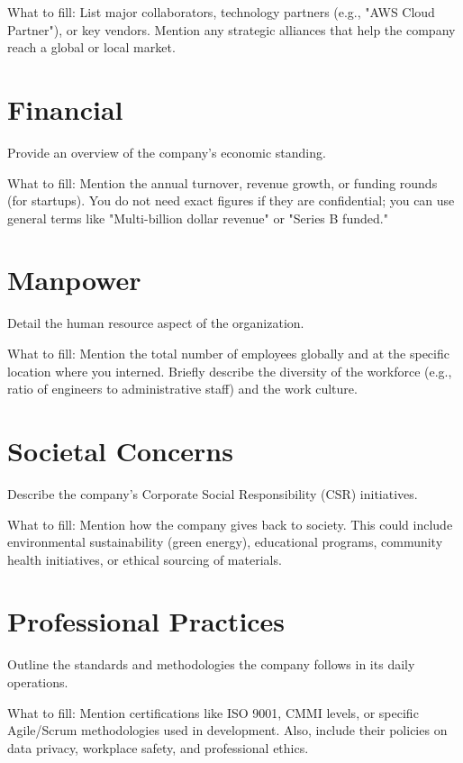 What to fill: List major collaborators, technology partners (e.g., "AWS Cloud Partner"), or key vendors. Mention any strategic alliances that help the company reach a global or local market.

\section{Financial}
Provide an overview of the company's economic standing.

What to fill: Mention the annual turnover, revenue growth, or funding rounds (for startups). You do not need exact figures if they are confidential; you can use general terms like "Multi-billion dollar revenue" or "Series B funded."

\section{Manpower}
Detail the human resource aspect of the organization.

What to fill: Mention the total number of employees globally and at the specific location where you interned. Briefly describe the diversity of the workforce (e.g., ratio of engineers to administrative staff) and the work culture.

\section{Societal Concerns}
Describe the company's Corporate Social Responsibility (CSR) initiatives.

What to fill: Mention how the company gives back to society. This could include environmental sustainability (green energy), educational programs, community health initiatives, or ethical sourcing of materials.

\section{Professional Practices}
Outline the standards and methodologies the company follows in its daily operations.

What to fill: Mention certifications like ISO 9001, CMMI levels, or specific Agile/Scrum methodologies used in development. Also, include their policies on data privacy, workplace safety, and professional ethics.


